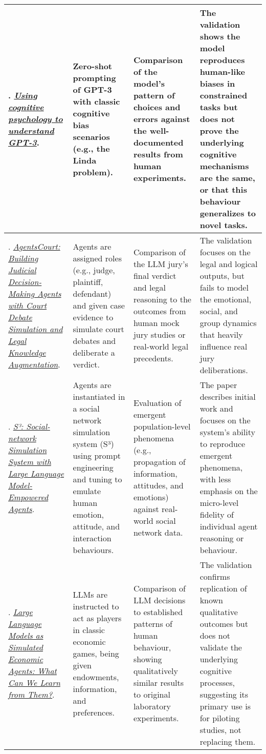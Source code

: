 {\begin{longtable}{| L{4.5cm} | L{3.5cm} | L{3.5cm} | L{3.5cm} |}
\citet{binz2023using}. \href{https://doi.org/10.1073/pnas.2218523120}{\textit{Using cognitive psychology to understand GPT-3}}. & Zero-shot prompting of GPT-3 with classic cognitive bias scenarios (e.g., the Linda problem). & Comparison of the model's pattern of choices and errors against the well-documented results from human experiments. & The validation shows the model reproduces human-like biases in constrained tasks but does not prove the underlying cognitive mechanisms are the same, or that this behaviour generalizes to novel tasks.
\\\hline
\citet{he2024agentscourt}. \href{https://arxiv.org/abs/2403.02959}{\textit{AgentsCourt: Building Judicial Decision-Making Agents with Court Debate Simulation and Legal Knowledge Augmentation}}. & Agents are assigned roles (e.g., judge, plaintiff, defendant) and given case evidence to simulate court debates and deliberate a verdict. & Comparison of the LLM jury's final verdict and legal reasoning to the outcomes from human mock jury studies or real-world legal precedents. & The validation focuses on the legal and logical outputs, but fails to model the emotional, social, and group dynamics that heavily influence real jury deliberations.
\\\hline
\citet{gao2023s3}. \href{https://arxiv.org/abs/2307.14984}{\textit{S³: Social-network Simulation System with Large Language Model-Empowered Agents}}. & Agents are instantiated in a social network simulation system (S³) using prompt engineering and tuning to emulate human emotion, attitude, and interaction behaviours. & Evaluation of emergent population-level phenomena (e.g., propagation of information, attitudes, and emotions) against real-world social network data. & The paper describes initial work and focuses on the system's ability to reproduce emergent phenomena, with less emphasis on the micro-level fidelity of individual agent reasoning or behaviour.
\\\hline
\citet{horton2023large}. \href{https://www.nber.org/papers/w31122}{\textit{Large Language Models as Simulated Economic Agents: What Can We Learn from Them?}}. & LLMs are instructed to act as players in classic economic games, being given endowments, information, and preferences. & Comparison of LLM decisions to established patterns of human behaviour, showing qualitatively similar results to original laboratory experiments. & The validation confirms replication of known qualitative outcomes but does not validate the underlying cognitive processes, suggesting its primary use is for piloting studies, not replacing them.

\end{longtable}}
